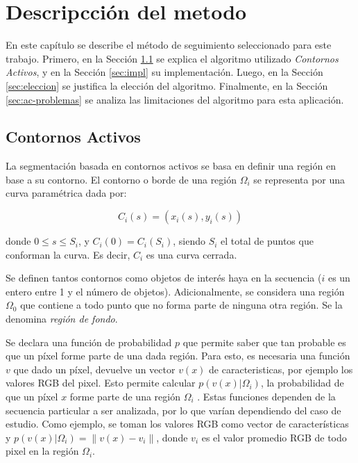 \chapter{Descripcción del metodo}

En este capítulo se describe el método de seguimiento seleccionado para este trabajo.
Primero, en la Sección \ref{sec:ac} se explica el algoritmo utilizado \emph{Contornos Activos},
y en la Sección \ref{sec:impl} su implementación. Luego, en la Sección \ref{sec:eleccion}
se justifica la elección del algoritmo. Finalmente, en la Sección \ref{sec:ac-problemas}
se analiza las limitaciones del algoritmo para esta aplicación.


\section{Contornos Activos}
\label{sec:ac}

La segmentación basada en contornos activos se basa en definir una región en base a su contorno.
El contorno o borde de una región $\Omega_i$ se representa por una curva paramétrica dada por:

\begin{equation}
    C_i(s) = (x_i(s), y_i(s))
\end{equation}

donde $0 \leq s \leq S_i$, y $C_i(0) = C_i(S_i)$, siendo $S_i$ el total de puntos que conforman la curva.
Es decir, $C_i$ es una curva cerrada.

Se definen tantos contornos como objetos de interés haya en la secuencia ($i$ es un entero entre 1 y el número de objetos).
Adicionalmente, se considera una región $\Omega_0$ que contiene a todo punto que no forma parte de ninguna otra región.
Se la denomina \textit{región de fondo}.

Se declara una función de probabilidad $p$ que permite saber que tan probable es que un píxel forme parte de una dada región.
Para esto, es necesaria una función $v$ que dado un píxel, devuelve un vector $v(x)$ de caracteristicas, por ejemplo los valores RGB del pixel.
Esto permite calcular $p(v(x) \vert \Omega_i)$, la probabilidad de que un píxel $x$ forme parte de una región $\Omega_i$ .
Estas funciones dependen de la secuencia particular a ser analizada, por lo que varían dependiendo del caso de estudio.
Como ejemplo, se toman los valores RGB como vector de características y
$p(v(x) \vert \Omega_i) = \| v(x) - v_i \| $, donde $v_i$ es el valor promedio RGB de todo pixel en la región $\Omega_i$.


